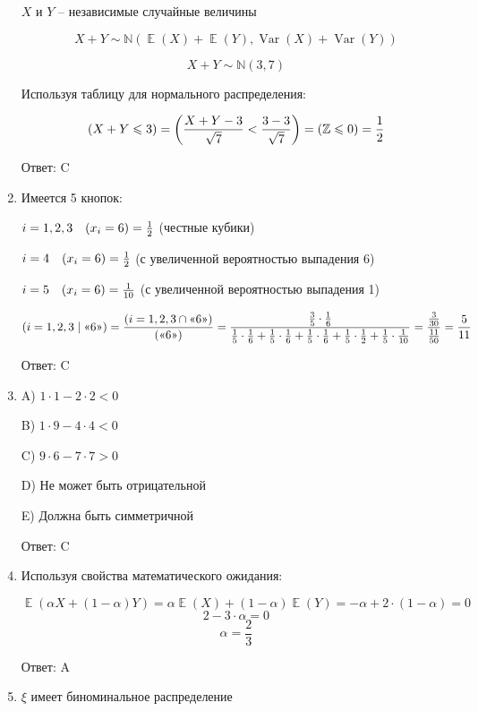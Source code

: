 \documentclass[a4paper]{article} %
\DeclareMathOperator{\Var}{Var}
\DeclareMathOperator{\E}{\mathbb{E}}
\let\P\relax
\DeclareMathOperator{\P}{\mathbb{P}}
\newcommand \N{\mathbb{N}}
\newcommand \Z{\mathbb{Z}}
\renewcommand{\leq}{\leqslant}
\begin{document}
\begin{enumerate}
    $X$ и $Y$ – независимые случайные величины

    \[X + Y \sim \N(\E(X) + \E(Y), \Var(X) + \Var(Y))\]

    \[X + Y \sim \N(3,7)\]
    
    Используя таблицу для нормального распределения:

    \[\P(X + Y\leq 3) = \P\left(\frac{X+Y-3}{\sqrt{7}} < \frac{3-3}{\sqrt{7}}\right) = (\Z\leq 0) = \frac{1}{2}\]

    Ответ: C

    \item

    Имеется 5 кнопок:

    $i=1,2,3 \quad \P(x_i = 6) =\frac{1}{2}$ (честные кубики)

    $i=4 \quad \P(x_i = 6) =\frac{1}{2}$ (с увеличенной вероятностью выпадения 6)

    $i=5 \quad \P(x_i = 6) =\frac{1}{10}$ (с увеличенной вероятностью выпадения 1)

    \[\P(i=1,2,3\mid \text{<<6>>}) = \frac{\P(i=1,2,3\cap \text{<<6>>})}{\P(\text{<<6>>})} = \frac{\frac{3}{5}\cdot \frac{1}{6}}{\frac{1}{5}\cdot \frac{1}{6} + \frac{1}{5}\cdot \frac{1}{6} + \frac{1}{5}\cdot \frac{1}{6} + \frac{1}{5}\cdot \frac{1}{2} + \frac{1}{5}\cdot \frac{1}{10}} = \frac{\frac{3}{30}}{\frac{11}{50}} = \frac{5}{11} \]

    Ответ: C

    \item

    A) $1\cdot1 - 2\cdot2 < 0$

    B) $1\cdot9 - 4\cdot4 < 0$

    C) $9\cdot6 - 7\cdot7 > 0$
    
    D) Не может быть отрицательной
    
    E) Должна быть симметричной

    Ответ: C

    \item
    
    Используя свойства математического ожидания:

    \[\E(\alpha X + (1 - \alpha)Y) = \alpha \E(X) + (1-\alpha) \E(Y) = -\alpha + 2\cdot(1-\alpha) = 0\]
    \[2 - 3\cdot\alpha = 0\]
    \[\alpha = \frac{2}{3}\]

    Ответ: A

    \item
    
    $\xi$ имеет биноминальное распределение


\end{enumerate}
\end{document}
